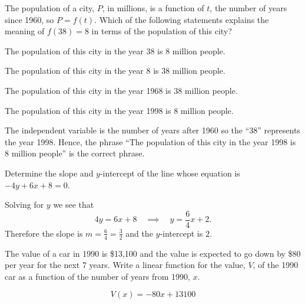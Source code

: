 \begin{exercises}
\item The population of a city, $P$, in millions, is a function of $t$, the number of
    years since 1960, so $P = f(t)$.  Which of the following statements explains the
    meaning of $f(38) = 8$ in terms of the population of this city?
    \ba
        \item The population of this city in the year 38 is 8 million people.
        \item The population of this city in the year 8 is 38 million people.
        \item The population of this city in the year 1968 is 38 million people.
        \item The population of this city in the year 1998 is 8 million people.
    \ea
\begin{exerciseSolution}
    The independent variable is the number of years after 1960 so the ``38'' represents
    the year 1998.  Hence, the phrase ``The population of this city in the year 1998 is 8
    million people'' is the correct phrase.
\end{exerciseSolution}

\item Determine the slope and $y$-intercept of the line whose equation is $-4y + 6x + 8 =
    0$.

\begin{exerciseSolution}
    Solving for $y$ we see that 
    \[ 4y = 6x + 8 \quad \implies \quad y = \frac{6}{4} x + 2. \]
    Therefore the slope is $m=\frac{6}{4} = \frac{3}{2}$ and the $y$-intercept is $2$.
\end{exerciseSolution}

\item The value of a car in 1990 is \$13,100 and the value is expected to go down by \$80
    per year for the next 7 years.  Write a linear function for the value, $V$, of the
    1990 car as a function of the number of years from 1990, $x$.  

\begin{exerciseSolution}
    \[ V(x) = -80x + 13100 \] 
\end{exerciseSolution}
\end{exercises}
\afterexercises
